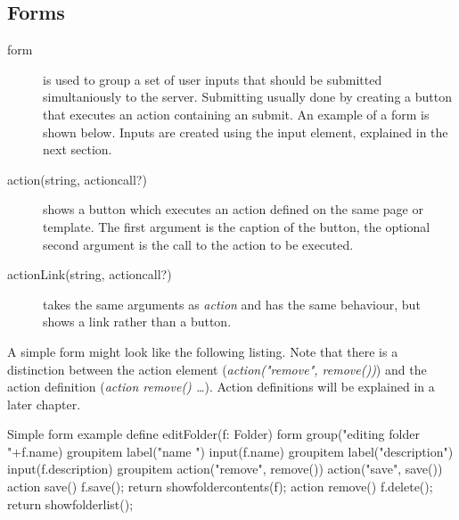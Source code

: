 \subsection{Forms}
\begin{description}
	\item[form{}] is used to group a set of user inputs that should be submitted simultaniously to the server. Submitting usually done by creating a button that executes an action containing an submit. An example of a form is shown below. Inputs are created using the input element, explained in the next section. 
	\item[action(string, actioncall?)] shows a button which executes an action defined on the same page or template. The first argument is the caption of the button, the optional second argument is the call to the action to be executed. 
	\item[actionLink(string, actioncall?)] takes the same arguments as \emph{action} and has the same behaviour, but shows a link rather than a button. 
\end{description}

A simple form might look like the following listing. Note that there is a distinction between the action element (\emph{action("remove", remove())}) and the action definition (\emph{action remove() { \ldots }}). Action definitions will be explained in a later chapter. 
\begin{webdsl}{Simple form example}
define editFolder(f: Folder) {
  form {
    group("editing folder "+f.name) {
      groupitem{
      	label("name ") {input(f.name) }
      }
      groupitem{
      	label("description") {input(f.description) }
      }
      groupitem {
      	action("remove", remove())
        action("save", save())
      }
    }
  }
  action save() {
    f.save();
    return showfoldercontents(f);
  }
  action remove() {
    f.delete();
    return showfolderlist();
  }
}
\end{webdsl}

